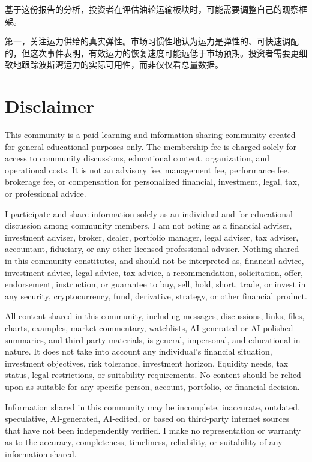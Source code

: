\documentclass[11pt]{ctexart}
\begin{document}
基于这份报告的分析，投资者在评估油轮运输板块时，可能需要调整自己的观察框架。

第一，关注运力供给的真实弹性。市场习惯性地认为运力是弹性的、可快速调配的，但这次事件表明，有效运力的恢复速度可能远低于市场预期。投资者需要更细致地跟踪波斯湾运力的实际可用性，而非仅仅看总量数据。

\section{Disclaimer}
{\scriptsize\color{refgray}
This community is a paid learning and information-sharing community created for general educational purposes only. The membership fee is charged solely for access to community discussions, educational content, organization, and operational costs. It is not an advisory fee, management fee, performance fee, brokerage fee, or compensation for personalized financial, investment, legal, tax, or professional advice.\par
I participate and share information solely as an individual and for educational discussion among community members. I am not acting as a financial adviser, investment adviser, broker, dealer, portfolio manager, legal adviser, tax adviser, accountant, fiduciary, or any other licensed professional adviser. Nothing shared in this community constitutes, and should not be interpreted as, financial advice, investment advice, legal advice, tax advice, a recommendation, solicitation, offer, endorsement, instruction, or guarantee to buy, sell, hold, short, trade, or invest in any security, cryptocurrency, fund, derivative, strategy, or other financial product.\par
All content shared in this community, including messages, discussions, links, files, charts, examples, market commentary, watchlists, AI-generated or AI-polished summaries, and third-party materials, is general, impersonal, and educational in nature. It does not take into account any individual's financial situation, investment objectives, risk tolerance, investment horizon, liquidity needs, tax status, legal restrictions, or suitability requirements. No content should be relied upon as suitable for any specific person, account, portfolio, or financial decision.\par
Information shared in this community may be incomplete, inaccurate, outdated, speculative, AI-generated, AI-edited, or based on third-party internet sources that have not been independently verified. I make no representation or warranty as to the accuracy, completeness, timeliness, reliability, or suitability of any information shared.\par
}
\end{document}
